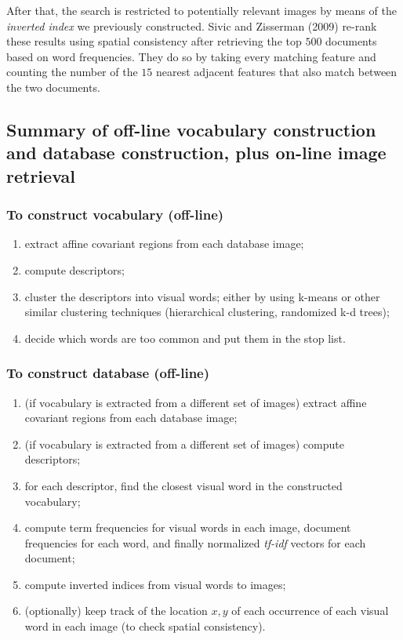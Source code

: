 \documentclass[10pt]{report}
\begin{document}
After that, the search is restricted to potentially relevant images by means of the \emph{inverted index} we previously constructed. Sivic and Zisserman (2009) re\--rank these results using spatial consistency after retrieving the top \(500\) documents based on word frequencies. They do so by taking every matching feature and counting the number of the \(15\) nearest adjacent features that also match between the two documents.

\subsection{Summary of off\--line vocabulary construction and database construction, plus on\--line image retrieval}
\label{sec:orgc8e22d3}
\subsubsection{To construct vocabulary (off\--line)}
\label{sec:orgd897878}
\begin{enumerate}
\item extract affine covariant regions from each database image;
\item compute descriptors;
\item cluster the descriptors into visual words; either by using k\--means or other similar clustering techniques (hierarchical clustering, randomized k\--d trees);
\item decide which words are too common and put them in the stop list.
\end{enumerate}

\subsubsection{To construct database (off\--line)}
\label{sec:orgf876a20}
\begin{enumerate}
\item (if vocabulary is extracted from a different set of images) extract affine covariant regions from each database image;
\item (if vocabulary is extracted from a different set of images) compute descriptors;
\item for each descriptor, find the closest visual word in the constructed vocabulary;
\item compute term frequencies for visual words in each image, document frequencies for each word, and finally normalized \emph{tf\--idf} vectors for each document;
\item compute inverted indices from visual words to images;
\item (optionally) keep track of the location \(x, y\) of each occurrence of each visual word in each image (to check spatial consistency).
\end{enumerate}
\end{document}
